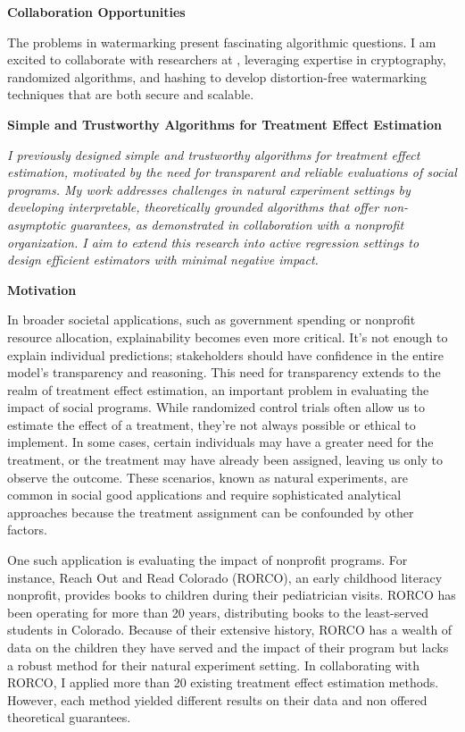 \documentclass[11pt]{article}
\begin{document}
{{ \large \textbf{Collaboration Opportunities}}

The problems in watermarking present fascinating algorithmic questions.
I am excited to collaborate with researchers at \school, leveraging expertise in cryptography, randomized algorithms, and hashing to develop distortion-free watermarking techniques that are both secure and scalable.

\begin{center}
    { \large \textbf{Simple and Trustworthy Algorithms for Treatment Effect Estimation}}    
\end{center}

\textit{I previously designed simple and trustworthy algorithms for treatment effect estimation, motivated by the need for transparent and reliable evaluations of social programs. My work addresses challenges in natural experiment settings by developing interpretable, theoretically grounded algorithms that offer non-asymptotic guarantees, as demonstrated in collaboration with a nonprofit organization. I aim to extend this research into active regression settings to design efficient estimators with minimal negative impact.}

{ \large \textbf{Motivation}}

In broader societal applications, such as government spending or nonprofit resource allocation, explainability becomes even more critical. It's not enough to explain individual predictions; stakeholders should have confidence in the entire model's transparency and reasoning. This need for transparency extends to the realm of treatment effect estimation, an important problem in evaluating the impact of social programs. While randomized control trials often allow us to estimate the effect of a treatment, they're not always possible or ethical to implement. In some cases, certain individuals may have a greater need for the treatment, or the treatment may have already been assigned, leaving us only to observe the outcome. These scenarios, known as natural experiments, are common in social good applications and require sophisticated analytical approaches because the treatment assignment can be confounded by other factors.

One such application is evaluating the impact of nonprofit programs. For instance, Reach Out and Read Colorado (RORCO), an early childhood literacy nonprofit, provides books to children during their pediatrician visits. RORCO has been operating for more than 20 years, distributing books to the least-served students in Colorado. Because of their extensive history, RORCO has a wealth of data on the children they have served and the impact of their program but lacks a robust method for their natural experiment setting. In collaborating with RORCO, I applied more than 20 existing treatment effect estimation methods. However, each method yielded different results on their data and non offered theoretical guarantees.

}
\end{document}
